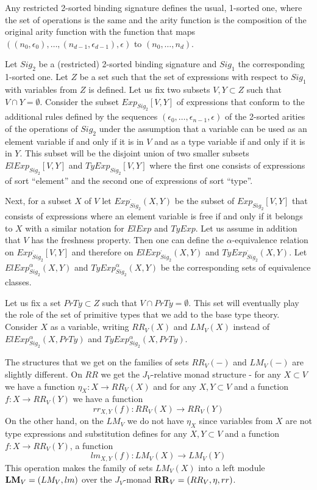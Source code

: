 \documentclass[12pt]{amsart}
\newcommand{\sr}{\rightarrow}
\newcommand{\RR}{{\bf RR}}
\newcommand{\LM}{{\bf LM}}
\begin{document}
Any restricted 2-sorted binding signature defines the usual, 1-sorted one, where the set of operations is the same and the arity function is the composition of the original arity function with the function that maps $((n_0,\epsilon_0),\dots,(n_{d-1},\epsilon_{d-1}),\epsilon)$ to $(n_0,\dots,n_d)$. 

Let $Sig_2$ be a (restricted) 2-sorted binding signature and $Sig_1$ the corresponding 1-sorted one. Let $Z$ be a set such that the set of expressions with respect to $Sig_1$ with variables from $Z$ is defined. Let us fix two subsets $V,Y\subset Z$ such that $V\cap Y=\emptyset$. Consider the subset $Exp_{Sig_2}[V,Y]$ of expressions that conform to the additional rules defined by the sequences $(\epsilon_0,\dots,\epsilon_{n-1},\epsilon)$ of the 2-sorted arities of the operations of $Sig_2$ under the assumption that a variable can be used as an element variable if and only if it is in $V$ and as a type variable if and only if it is in $Y$. This subset will be the disjoint union of two smaller subsets $ElExp_{Sig_2}[V,Y]$ and $TyExp_{Sig_2}[V,Y]$ where the first one consists of expressions of sort ``element'' and the second one of expressions of sort ``type''.  

Next, for a subset $X$ of $V$ let $Exp^{\cdot}_{Sig_2}(X,Y)$ be the subset of $Exp_{Sig_2}[V,Y]$ that consists of expressions where an element variable is free if and only if it belongs to $X$ with a similar notation for $ElExp$ and $TyExp$. Let us assume in addition that $V$ has the freshness property. Then one can define the $\alpha$-equivalence relation on $Exp^{\cdot}_{Sig_2}[V,Y]$ and therefore on $ElExp^{\cdot}_{Sig_2}(X,Y)$ and $TyExp^{\cdot}_{Sig_2}(X,Y)$. Let $ElExp^{\alpha}_{Sig_2}(X,Y)$ and $TyExp_{Sig_2}^{\alpha}(X,Y)$ be the corresponding sets of equivalence classes. 

Let us fix a set $PrTy\subset Z$ such that $V\cap PrTy=\emptyset$. This set will eventually play the role of the set of primitive types that we  add to the base type theory. Consider $X$ as a variable, writing $RR_V(X)$ and $LM_V(X)$ instead of $ElExp^{\alpha}_{Sig_2}(X,PrTy)$ and $TyExp_{Sig_2}^{\alpha}(X,PrTy)$. 

The structures that we get on the families of sets $RR_V(-)$ and $LM_V(-)$ are slightly different. On $RR$ we get the $J_V$-relative monad structure - for any $X\subset V$ we have a function $\eta_X:X\sr RR_V(X)$ and for any $X,Y\subset V$ and a function $f:X\sr RR_V(Y)$ we have a function 
%
$$rr_{X,Y}(f):RR_V(X)\sr RR_V(Y)$$
%
On the other hand, on the $LM_V$ we do not have $\eta_X$ since variables from $X$ are not type expressions and substitution defines for any $X,Y\subset V$ and a function $f:X\sr RR_V(Y)$, a function 
%
$$lm_{X,Y}(f):LM_V(X)\sr LM_V(Y)$$
%
This operation makes the family of sets $LM_V(X)$ into a left module $\LM_V=(LM_V, lm)$ over the $J_V$-monad $\RR_V=(RR_V,\eta,rr)$.
\end{document}
